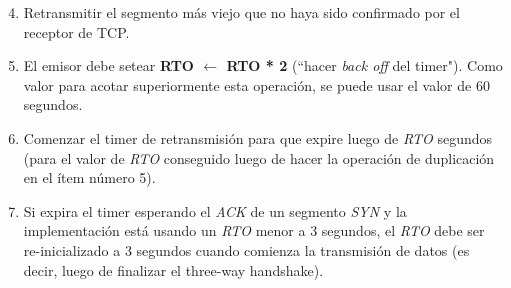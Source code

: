 \begin{enumerate}
 \setcounter{enumi}{3}
 \item Retransmitir el segmento más viejo que no haya sido confirmado
	por el receptor de TCP.
 \item El emisor debe setear \textbf{RTO $\leftarrow$ RTO * 2} (``hacer
	\textit{back off} del timer"). Como valor para acotar superiormente
	esta operación, se puede usar el valor de 60 segundos.
 \item Comenzar el timer de retransmisión para que expire luego de \textit{RTO}
	segundos (para el valor de \textit{RTO} conseguido luego de hacer la
	operación de duplicación en el ítem número 5).
 \item Si expira el timer esperando el \textit{ACK} de un segmento \textit{SYN}
	y la implementación está usando un \textit{RTO} menor a 3 segundos, el
	\textit{RTO} debe ser re-inicializado a 3 segundos cuando comienza la
	transmisión de datos (es decir, luego de finalizar el three-way handshake).
\end{enumerate}
